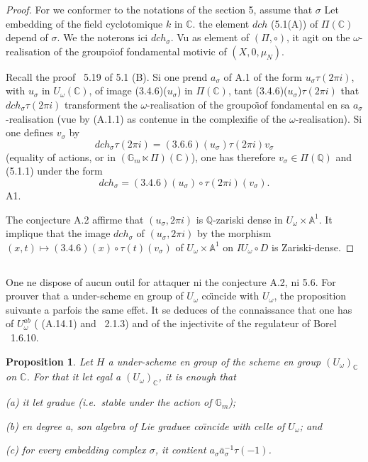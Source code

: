 \documentclass[11pt,a4paper]{article}
\theoremstyle{plain}
\newtheorem{proposition}[theorem]{Proposition}
\theoremstyle{definition}
\newcommand{\dch}{\mathit{dch}}
\newcommand{\Gm}{\mathbb{G}_m}
\newcommand{\Q}{\mathbb{Q}}
\newcommand{\C}{\mathbb{C}}
\newcommand{\A}{\mathbb{A}}
\begin{document}
\begin{proof}
For we conformer to the notations of the section 5, assume that $\sigma$ Let embedding of the field cyclotomique $k$ in $\C$. the element $\dch$ (5.1(A)) of $\Pi(\C)$ depend of $\sigma$. We the noterons ici $\dch_\sigma$. Vu as element of $(\Pi, \circ)$, it agit on the $\omega$-realisation of the groupo\"{\i}of fondamental motivic of $(X, 0, \mu_N)$.

Recall the proof \cite{1}~5.19 of 5.1 (B). Si one prend $a_\sigma$ of A.1 of the form $u_\sigma \tau(2\pi i)$, with $u_\sigma$ in $U_\omega(\C)$, of image (3.4.6)($u_\sigma$) in $\Pi(\C)$, tant (3.4.6)($u_\sigma$)$\tau(2\pi i)$ that $\dch_\sigma \tau(2\pi i)$ transforment the $\omega$-realisation of the groupo\"{\i}of fondamental en sa $a_\sigma$-realisation (vue by (A.1.1) as contenue in the complexifie of the $\omega$-realisation). Si one defines $v_\sigma$ by
\[
\dch_\sigma \tau(2\pi i) = (3.6.6)(u_\sigma) \tau(2\pi i) v_\sigma
\]
(equality of actions, or in $(\Gm \ltimes \Pi)(\C)$), one has therefore $v_\sigma \in \Pi(\Q)$ and (5.1.1) under the form
\begin{equation}\label{eq:A.3.1}
\dch_\sigma = (3.4.6)(u_\sigma) \circ \tau(2\pi i)(v_\sigma).
\end{equation}
A1.

The conjecture A.2 affirme that $(u_\sigma, 2\pi i)$ is $\Q$-zariski dense in $U_\omega \times \A^1$. It implique that the image $\dch_\sigma$ of $(u_\sigma, 2\pi i)$ by the morphism $(x,t) \mapsto (3.4.6)(x) \circ \tau(t)(v_\sigma)$ of $U_\omega \times \A^1$ on $IU_\omega \circ D$ is Zariski-dense.
\end{proof}

\subsection{}
One ne dispose of aucun outil for attaquer ni the conjecture A.2, ni 5.6. For prouver that a under-scheme en group of $U_\omega$ co\"{\i}ncide with $U_\omega$, the proposition suivante a parfois the same effet. It se deduces of the connaissance that one has of $U_\omega^{ab}$ (\cite{1} (A.14.1) and \cite{1}~2.1.3) and of the injectivite of the regulateur of Borel \cite{1}~1.6.10.

\begin{proposition}\label{prop:A.4}
Let $H$ a under-scheme en group of the scheme en group $(U_\omega)_\C$ on $\C$. For that it let egal a $(U_\omega)_\C$, it is enough that

\emph{(a)} it let gradue (i.e.~stable under the action of $\Gm$);

\emph{(b)} en degree a, son algebra of Lie graduee co\"{\i}ncide with celle of $U_\omega$; and

\emph{(c)} for every embedding complex $\sigma$, it contient $a_\sigma \bar{a}_\sigma^{-1} \tau(-1)$.
\end{proposition}
\end{document}
